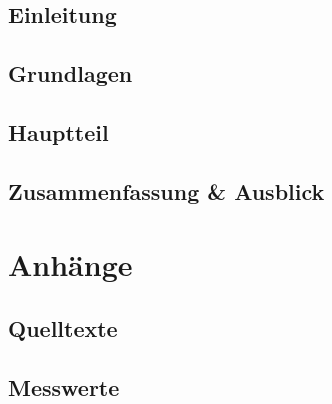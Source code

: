 \documentclass[twoside,a4paper,11pt,openright]{report}
\begin{document}
%
%




\cleardoublepage


\cleardoublepage


\tableofcontents




%
%

\cleardoublepage
{}

\chapter{Einleitung}


\chapter{Grundlagen}

\chapter{Hauptteil}

\chapter{Zusammenfassung \& Ausblick}


%
%

\appendix
\part*{Anhänge}
\markboth{}{}


\chapter{Quelltexte}

\chapter{Messwerte}




\cleardoublepage

\cleardoublepage

\end{document}
